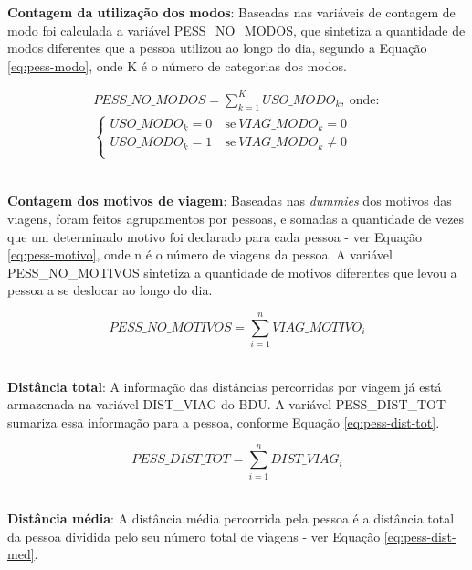 \begin{compactitem}
\newpage
\item \textbf{Contagem da utilização dos modos}: Baseadas nas variáveis de contagem de modo foi calculada a variável PESS_NO_MODOS, que sintetiza a quantidade de modos diferentes que a pessoa utilizou ao longo do dia, segundo a Equação \eqref{eq:pess-modo}, onde K é o número de categorias dos modos.

\begin{equation}\label{eq:pess-modo}
\begin{split}
PESS\_NO\_MODOS=\displaystyle\sum_{k=1}^{K}USO\_MODO_{k},\ \text{onde}:\\
\begin{cases}
        USO\_MODO_{k}=0 & \ \text{se}\  VIAG\_MODO_{k}=0\\
        USO\_MODO_{k}=1 & \ \text{se}\  VIAG\_MODO_{k} \neq 0\\
\end{cases}
\end{split}
\end{equation}\\

\item \textbf{Contagem dos motivos de viagem}: Baseadas nas \textit{dummies} dos motivos das viagens, foram feitos agrupamentos por pessoas, e somadas a quantidade de vezes que um determinado motivo foi declarado para cada pessoa - ver Equação \eqref{eq:pess-motivo}, onde n é o número de viagens da pessoa.
A variável PESS_NO_MOTIVOS sintetiza a quantidade de motivos diferentes que levou a pessoa a se deslocar ao longo do dia.

\begin{equation}\label{eq:pess-motivo}
PESS\_NO\_MOTIVOS=\displaystyle\sum_{i=1}^{n}VIAG\_MOTIVO_{i}
\end{equation}\\

\item \textbf{Distância total}: A informação das distâncias percorridas por viagem já está armazenada na variável DIST_VIAG do BDU. A variável PESS_DIST_TOT sumariza essa informação para a pessoa, conforme Equação \eqref{eq:pess-dist-tot}.

\begin{equation}\label{eq:pess-dist-tot}
PESS\_DIST\_TOT=\displaystyle\sum_{i=1}^{n}DIST\_VIAG_{i}
\end{equation}\\

\item \textbf{Distância média}: A distância média percorrida pela pessoa é a distância total da pessoa dividida pelo seu número total de viagens - ver Equação \eqref{eq:pess-dist-med}.


\end{compactitem}
